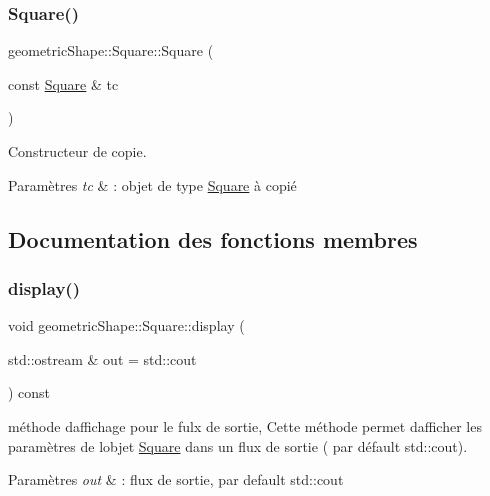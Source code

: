 \subsubsection{\texorpdfstring{Square()}{Square()}\hspace{0.1cm}{\footnotesize\ttfamily [2/2]}}
{\footnotesize\ttfamily geometric\+Shape\+::\+Square\+::\+Square (\begin{DoxyParamCaption}\item[{const \hyperlink{classgeometric_shape_1_1_square}{Square} \&}]{tc }\end{DoxyParamCaption})}



Constructeur de copie. 


\begin{DoxyParams}{Paramètres}
{\em tc} & \+: objet de type \hyperlink{classgeometric_shape_1_1_square}{Square} à copié \\
\hline
\end{DoxyParams}


\subsection{Documentation des fonctions membres}
\mbox{\label{classgeometric_shape_1_1_square_a945551a983f2476d6e39c572f7f66ec9}} 
\subsubsection{\texorpdfstring{display()}{display()}}
{\footnotesize\ttfamily void geometric\+Shape\+::\+Square\+::display (\begin{DoxyParamCaption}\item[{std\+::ostream \&}]{out = {\ttfamily std\+:\+:cout} }\end{DoxyParamCaption}) const\hspace{0.3cm}{\ttfamily [virtual]}}



méthode d\textquotesingle{}affichage pour le fulx de sortie, Cette méthode permet d\textquotesingle{}afficher les paramètres de l\textquotesingle{}objet \hyperlink{classgeometric_shape_1_1_square}{Square} dans un flux de sortie ( par défault std\+::cout). 


\begin{DoxyParams}{Paramètres}
{\em out} & \+: flux de sortie, par default std\+::cout \\
\hline
\end{DoxyParams}


